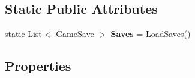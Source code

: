 \subsection*{Static Public Attributes}
\begin{DoxyCompactItemize}
\item 
\mbox{\label{class_tentacle_slicers_1_1maps_1_1_game_save_aba1e8c60b3ecb7ff4214fd86460c23cb}} 
static List$<$ \hyperlink{class_tentacle_slicers_1_1maps_1_1_game_save}{Game\+Save} $>$ {\bfseries Saves} = Load\+Saves()
\end{DoxyCompactItemize}
\subsection*{Properties}
